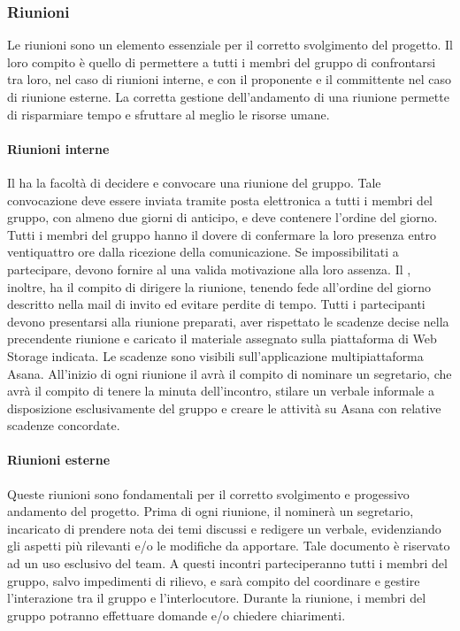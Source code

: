 		\subsubsection{Riunioni}
		Le riunioni sono un elemento essenziale per il corretto svolgimento del progetto. Il loro compito è quello di permettere a tutti i membri del gruppo di confrontarsi tra loro, nel caso di riunioni interne, e con il proponente e il committente nel caso di riunione esterne. La corretta gestione dell'andamento di una riunione permette di risparmiare tempo e sfruttare al meglio le risorse umane.
		
			\paragraph{Riunioni interne}
			Il \textit{\RdP} ha la facoltà di decidere e convocare una riunione del gruppo. Tale convocazione deve essere inviata tramite posta elettronica a tutti i membri del gruppo, con almeno due giorni di anticipo, e deve contenere l’ordine del giorno. Tutti i membri del gruppo hanno il dovere di confermare la loro presenza entro ventiquattro ore dalla ricezione della comunicazione. Se impossibilitati a partecipare, devono fornire al \textit{\RdP} una valida motivazione alla loro assenza. Il \textit{\RdP}, inoltre, ha il compito di dirigere la riunione, tenendo fede all’ordine del giorno descritto nella mail di invito ed evitare perdite di tempo. Tutti i partecipanti devono presentarsi alla riunione preparati, aver rispettato le scadenze decise nella precendente riunione e caricato il materiale assegnato sulla piattaforma di Web Storage indicata. Le scadenze sono visibili sull'applicazione multipiattaforma Asana.
			All’inizio di ogni riunione il \textit{\RdP} avrà il compito di nominare un segretario, che avrà il compito di tenere la minuta dell’incontro, stilare un verbale informale a disposizione esclusivamente del gruppo e creare le attività su Asana con relative scadenze concordate.  
		
			\paragraph{Riunioni esterne}
			Queste riunioni sono fondamentali per il corretto svolgimento e progessivo andamento del progetto. Prima di ogni riunione, il \textit{\RdP} nominerà un segretario, incaricato di prendere nota dei temi discussi e redigere un verbale, evidenziando gli aspetti più rilevanti e/o le modifiche da apportare. Tale documento è riservato ad un uso esclusivo del team.
			A questi incontri parteciperanno tutti i membri del gruppo, salvo impedimenti di rilievo, e sarà compito del \textit{\RdP} coordinare e gestire l’interazione tra il gruppo e l’interlocutore. Durante la riunione, i membri del gruppo potranno effettuare domande e/o chiedere chiarimenti. 
			
